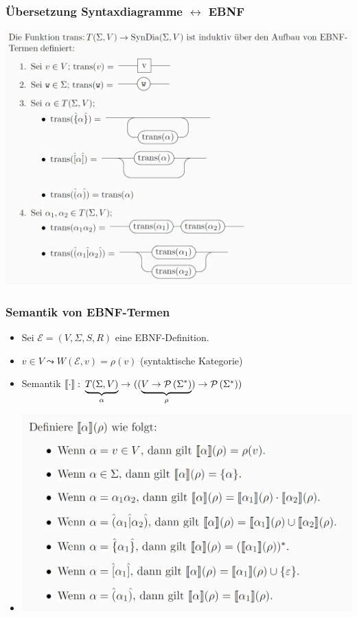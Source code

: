 \documentclass{beamer}
\newcommand{\sem}[1]{\left\llbracket #1 \right\rrbracket}
\begin{document}
\begin{frame} \frametitle{Übersetzung Syntaxdiagramme $\leftrightarrow$ EBNF}
	\centering
	\includegraphics[width=.9\textwidth]{tut03_trans.jpg}
\end{frame}

\begin{frame} \frametitle{Semantik von EBNF-Termen}
	\begin{itemize}
		\item Sei $\mathcal{E} = (V,\Sigma,S,R)$ eine EBNF-Definition.
		\item $v \in V \leadsto W(\mathcal{E},v) = \rho(v)$ (syntaktische Kategorie)
		\item Semantik $\abb{\sem{\cdot}}{\underbrace{T(\Sigma, V)}_{\alpha}}{((\underbrace{V \to \pows{\Sigma^\ast}}_{\rho}) \to \pows{\Sigma^\ast})}$
		\item[] \includegraphics[width=.9\textwidth]{tut03_semantik.jpg}
	\end{itemize}	
\end{frame}
\end{document}
